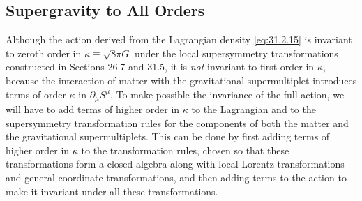 
\subsection{Supergravity to All Orders}

Although the action derived from the Lagrangian density
\eqref{eq:31.2.15} is invariant to zeroth order in
\(\kappa\equiv\sqrt{8\pi G}\) under the local supersymmetry
transformations constructed in Sections 26.7 and 31.5, it is \emph{not}
invariant to first order in \(\kappa\), because the interaction of matter
with the gravitational supermultiplet introduces terms of order
\(\kappa\) in \(\partial_\mu S^\mu\). To make possible the invariance of
the full action, we will have to add terms of higher order in \(\kappa\)
to the Lagrangian and to the supersymmetry transformation rules for the
components of both the matter and the gravitational supermultiplets. This
can be done by first adding terms of higher order in \(\kappa\) to the
transformation rules, chosen so that these transformations form a closed
algebra along with local Lorentz transformations and general coordinate
transformations, and then adding terms to the action to make it invariant
under all these transformations.

